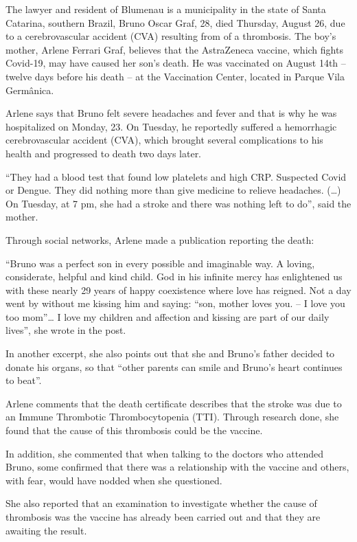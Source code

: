 The lawyer and resident of Blumenau is a municipality in the state of Santa
Catarina, southern Brazil, Bruno Oscar Graf, 28, died Thursday, August 26, due
to a cerebrovascular accident (CVA) resulting from of a thrombosis. The boy’s
mother, Arlene Ferrari Graf, believes that the AstraZeneca vaccine, which fights
Covid-19, may have caused her son’s death. He was vaccinated on August 14th –
twelve days before his death – at the Vaccination Center, located in Parque Vila
Germânica.

Arlene says that Bruno felt severe headaches and fever and that is why he was
hospitalized on Monday, 23. On Tuesday, he reportedly suffered a hemorrhagic
cerebrovascular accident (CVA), which brought several complications to his
health and progressed to death two days later.

“They had a blood test that found low platelets and high CRP. Suspected Covid or
Dengue. They did nothing more than give medicine to relieve headaches. (…) On
Tuesday, at 7 pm, she had a stroke and there was nothing left to do”, said the
mother.

Through social networks, Arlene made a publication reporting the death:

“Bruno was a perfect son in every possible and imaginable way. A loving,
considerate, helpful and kind child. God in his infinite mercy has enlightened
us with these nearly 29 years of happy coexistence where love has reigned. Not a
day went by without me kissing him and saying: “son, mother loves you. – I love
you too mom”… I love my children and affection and kissing are part of our daily
lives”, she wrote in the post.

In another excerpt, she also points out that she and Bruno’s father decided to
donate his organs, so that “other parents can smile and Bruno’s heart continues
to beat”.

Arlene comments that the death certificate describes that the stroke was due to
an Immune Thrombotic Thrombocytopenia (TTI). Through research done, she found
that the cause of this thrombosis could be the vaccine.

In addition, she commented that when talking to the doctors who attended Bruno,
some confirmed that there was a relationship with the vaccine and others, with
fear, would have nodded when she questioned.

She also reported that an examination to investigate whether the cause of
thrombosis was the vaccine has already been carried out and that they are
awaiting the result.

